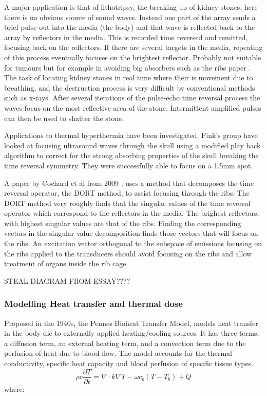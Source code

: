 \documentclass[11pt]{article} %
\begin{document}
\begin{itemize}
		A major application is that of lithotripsy, the breaking up of kidney stones, here there is no obvious source of sound waves. Instead one part of the array sends a brief pulse out into the media (the body) and that wave is reflected back to the array by reflectors in the media. This is recorded time reversed and remitted, focusing back on the reflectors. If there are several targets in the media, repeating of this process eventually focuses on the brightest reflector. 
		Probably not suitable for tumours but for example in avoiding big absorbers such as the ribs  paper \cite{Cochard2009}. The task of locating kidney stones in real time where their is movement due to breathing, and the destruction process is very difficult by conventional methods such as x-rays. After several iterations of the pulse-echo time reversal process the  waves focus on the most reflective area of the stone. Intermittent amplified pulses can then be used to shatter the stone. 
		
		Applications to thermal hyperthermia have been investigated. Fink's group have looked at focusing ultrasound waves through the skull using a modified play back algorithm to correct for the strong absorbing properties of the skull breaking the time reversal symmetry. They were successfully able to focus on a 1.5mm spot. 
		
		A paper by Cochard et al from 2009 \cite{Cochard2009}, uses a method that decomposes the time reversal operator, the DORT method, to assist focusing through the ribs. The DORT method very roughly finds that the singular values of the time reversal operator  which correspond to the reflectors in the media. The brighest reflectors, with highest singular values are that of the ribs. Finding the corresponding vectors in the singular value decomposition finds those vectors that will focus on the ribs. An excitation vector orthogonal to the subspace of emissions focusing on the ribs applied to the transducers should avoid focusing on the ribs and allow treatment of organs inside the rib cage. 
		
		STEAL DIAGRAM FROM ESSAY????
	\end{itemize}
	
		
		
	
	\subsubsection{Modelling Heat transfer and thermal dose}
	

	Proposed in the 1940s, the Pennes Bioheat Transfer Model, \cite{Pennes1948} models heat transfer in the body die to externally applied heating/cooling sources. It has three terms, a diffusion term, an external heating term, and a convection term due to the perfusion of heat due to blood flow. The model accounts for the thermal conductivity, specific heat capacity and blood perfusion of specific tissue types. 
	\begin{equation}
		\boxed{\rho c \frac{\partial T}{\partial t}= \nabla\cdot k \nabla T-\omega c_b (T-T_b)+Q}
	\end{equation}
	where:
	
\end{document}
